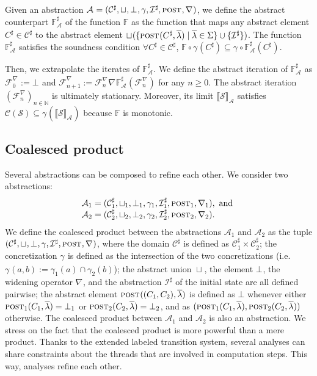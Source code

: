 \documentclass{article}
\newcommand{\bydef}{:=}
\newcommand{\System}{\mathcal{S}}
\newcommand{\states}{\mathcal{C}}
\newcommand{\Coll}{\states(\System)}
\newcommand{\extendedSigma}{\Sigma}
\newcommand{\ExtendedSigma}{\extendedSigma}
\newcommand{\abstraction}[1]{\mathcal{A}_{#1}}
\newcommand{\abst}[1]{\textsc{post}_{#1}}
\newcommand{\aunion}[1]{\sqcup_{#1}}
\newcommand{\adom}[1]{\mathcal{C}_{#1}^{\sharp}}
\newcommand{\abot}[1]{\bot_{#1}}
\newcommand{\conc}[1]{\gamma_{#1}}
\newcommand{\ainit}[1]{\mathcal{I}_{#1}^{\sharp}}
\newcommand{\wid}[1]{\nabla_{#1}}
\newcommand{\tuple}[1]{(\adom{#1},
                        \aunion{#1},
                        \abot{#1},\conc{#1},
                        \ainit{#1},
                        \abst{#1},
                        \wid{#1})}
\newcommand{\limit}[1]{\llbracket \mathcal{S} 
                       \rrbracket_{\abstraction{#1}}}
\newcommand{\counterpart}[1]{\mathbb{F}_{\scriptscriptstyle\!\mathcal{A}_{#1}}^{\sharp}}
\newcommand{\iteraten}[2]{\mathcal{F}_{#2}^{\scriptscriptstyle \wid{#1}}}
\begin{document}
Given an abstraction $\abstraction{}=\tuple{}$, we define the abstract counterpart $\counterpart{}$ of the function 
$\mathbb{F}$ as the function that maps any abstract element $C^{\sharp}\in\adom{}$ to the abstract element $\aunion{}
(\{\abst{}(C^{\sharp},\overline{\lambda}) \;|\; \overline{\lambda}\in\ExtendedSigma\}\cup\{\ainit{}\})$.
The function $\counterpart{}$ satisfies the soundness condition $\forall C^\sharp  \in
\mathcal{C}^\sharp$, $\mathbb{F}\circ\conc{}(C^\sharp)\subseteq
\conc{}\circ\counterpart{}(C^\sharp)$. 

Then, we extrapolate the iterates of $\counterpart{}$.
We define the abstract iteration \cite{cc:frameworks,cc:galois-widening} of $\counterpart{}$ as $\iteraten{}{0} \bydef \abot{}$  
 and $\iteraten{}{n+1} \bydef \iteraten{}{n} {\wid{}} \counterpart{}(\iteraten{}{n})$ for any $n\geq 0$.
The abstract iteration $(\iteraten{}{n})_{n\in\mathbb{N}}$
is ultimately stationary.
Moreover, its limit $\limit{}$ satisfies $\Coll\subseteq
\conc{}(\limit{})$ because $\mathbb{F}$ is monotonic.

\subsection{Coalesced product}
\label{product}
Several abstractions can be composed to refine each other.
We consider two abstractions:
\begin{equation*}
\begin{array}{l}
\abstraction{1}=\tuple{1}, \text{ and } \cr
\abstraction{2}=\tuple{2}.
\end{array}
\end{equation*}
We define the coalesced product between the abstractions $\abstraction{1}$ and $\abstraction{2}$ as the tuple $\tuple{}$, 
where the domain $\adom{}$ is defined as $\adom{1} \times \adom{2}$; 
the concretization $\conc{}$ is defined as the intersection of the two concretizations (i.e.~$\conc{}(a,b)\bydef\conc{1}(a)\cap\conc{2}(b)$);
the abstract union $\aunion{}$, the element $\abot{}$, the widening operator $\wid{}$, and the abstraction $\ainit{}$ of the initial state  are all defined pairwise; the abstract element $\abst{}((C_1,C_2),\overline{\lambda})$ is defined as 
$\bot$ whenever either $\abst{1}(C_1,\overline{\lambda})=\abot{1}$ or 
$\abst{2}(C_2,\overline{\lambda})=\abot{2}$, and as
$(\abst{1}(C_1,\overline{\lambda}),\abst{2}(C_2,\overline{\lambda}))$ otherwise.
The coalesced product between $\abstraction{1}$ and $\abstraction{2}$ is also an abstraction. 
We stress on the fact that the coalesced product is more powerful than a mere product. Thanks to the extended labeled transition system, several analyses can share 
constraints about the threads that are involved 
in computation steps. This way, analyses refine each other. 
\end{document}
